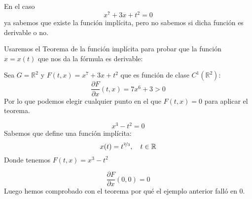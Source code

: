\begin{ejemplo}
    En el caso
    \begin{equation*}
        x^7+3x+t^2 = 0
    \end{equation*}
    ya sabemos que existe la función implícita, pero no sabemos si dicha función es derivable o no.

    Usaremos el Teorema de la función implícita para probar que la función $x=x(t)$ que nos da la fórmula es derivable:

    Sea $G = \mathbb{R}^2$ y $F(t,x) = x^7+3x+t^2$ que es función de clase $C^1(\mathbb{R}^2)$:
    \begin{equation*}
        \dfrac{\partial F}{\partial x}(t,x) = 7x^6 + 3 > 0
    \end{equation*}
    Por lo que podemos elegir cualquier punto en el que $F(t,x) = 0$ para aplicar el teorema.
\end{ejemplo}

\begin{ejemplo}
    \begin{equation*}
        x^3-t^2 = 0
    \end{equation*}
    Sabemos que define una función implícita:
    \begin{equation*}
        x(t) = t^{\nicefrac{2}{3}}, \quad t\in \mathbb{R}
    \end{equation*}
    Donde tenemos $F(t,x) = x^3- t^2$

    \begin{equation*}
        \dfrac{\partial F}{\partial x}(0,0) = 0
    \end{equation*}
    Luego hemos comprobado con el teorema por qué el ejemplo anterior falló en 0.
\end{ejemplo}

